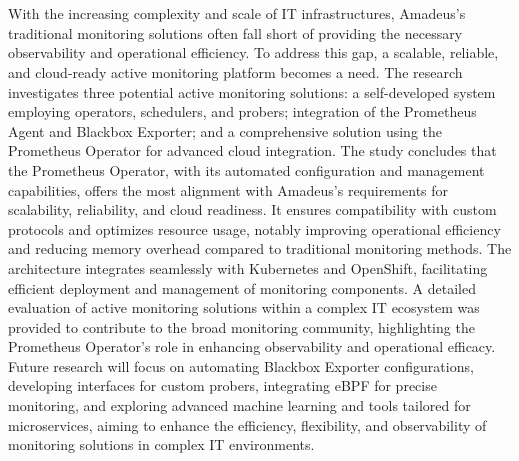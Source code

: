 \chapter{\abstractname}


With the increasing complexity and scale of IT infrastructures, Amadeus's traditional monitoring solutions often fall short of providing the necessary observability and operational efficiency. To address this gap, a scalable, reliable, and cloud-ready active monitoring platform becomes a need. The research investigates three potential active monitoring solutions: a self-developed system employing operators, schedulers, and probers; integration of the Prometheus Agent and Blackbox Exporter; and a comprehensive solution using the Prometheus Operator for advanced cloud integration. The study concludes that the Prometheus Operator, with its automated configuration and management capabilities, offers the most alignment with Amadeus's requirements for scalability, reliability, and cloud readiness. It ensures compatibility with custom protocols and optimizes resource usage, notably improving operational efficiency and reducing memory overhead compared to traditional monitoring methods. The architecture integrates seamlessly with Kubernetes and OpenShift, facilitating efficient deployment and management of monitoring components. A detailed evaluation of active monitoring solutions within a complex IT ecosystem was provided to contribute to the broad monitoring community, highlighting the Prometheus Operator's role in enhancing observability and operational efficacy. Future research will focus on automating Blackbox Exporter configurations, developing interfaces for custom probers, integrating eBPF for precise monitoring, and exploring advanced machine learning and tools tailored for microservices, aiming to enhance the efficiency, flexibility, and observability of monitoring solutions in complex IT environments. 